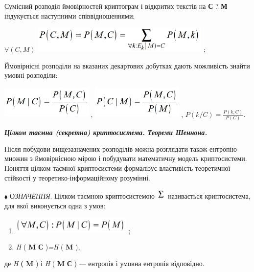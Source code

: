 Сумісний розподіл ймовірностей  криптограм і відкритих текстів на  \textbf{С}
$?$ \textbf{М}  індукується наступними співвідношеннями:


\bigskip

{\centering
 $\forall (C,M)$   
\includegraphics[width=3.478in,height=0.5209in]{crypt-img/crypt-img19.png} ;
\par}

Ймовірнісні розподіли на вказаних декартових добутках дають можливість знайти
умовні розподіли:

{\centering
 \includegraphics[width=1.7902in,height=0.6354in]{crypt-img/crypt-img20.png} ,  
\includegraphics[width=1.7874in,height=0.6335in]{crypt-img/crypt-img21.png} ,  
$P(k/C)=\frac{P(k,C)}{P(C)}$.
\par}


\bigskip


\bigskip

{\centering\bfseries\itshape
Цілком таємна (секретна)  криптосистема. Теореми  Шеннона.
\par}


\bigskip


\bigskip

Після побудови вищезазначених розподілів можна розглядати також  ентропію множин
з ймовірнісною мірою і побудувати математичну модель криптосистеми. Поняття
цілком таємної криптосистеми формалізує властивість теоретичної стійкості у
теоретико-інформаційному розумінні.


\bigskip

$\blacklozenge$ О\textit{ЗНАЧЕННЯ}. Цілком таємною криптосистемою 
\includegraphics[width=0.1882in,height=0.2008in]{crypt-img/crypt-img22.png} 
називається криптосистема, для якої виконується одна з умов:

\liststyleWWviiiNumxliii
\begin{enumerate}
\item 
\includegraphics[width=2.3417in,height=0.3346in]{crypt-img/crypt-img23.png} ;
\item  \textit{H}\textit{ }( \textbf{M} {\textbar} \textbf{С}
)\textit{=}\textit{H}\textit{ }( \textbf{M} ), 
\end{enumerate}
де  \textit{H} \textbf{( }\textbf{M} )  і  \textit{H} (  \textbf{M}\textbf{
{\textbar} С} ) --- ентропія і  умовна ентропія відповідно.

